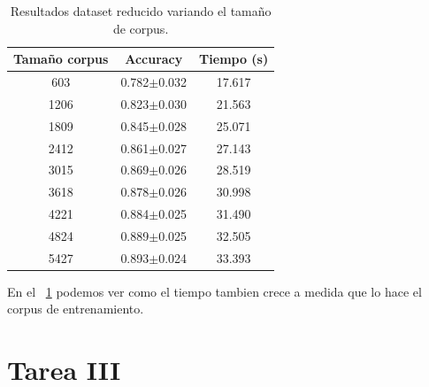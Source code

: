 \documentclass[11pt,a4paper]{report}
\begin{document}
    	\begin{table}[thb!]
    		\begin{center} 		
    			\begin{tabular}{ccc} 
    				\hline	
    				\textbf{Tamaño corpus}&\textbf{Accuracy}&\textbf{Tiempo (s)}\\
    				\hline
                    603&0.782$\pm$0.032&17.617\\
                    1206&0.823$\pm$0.030&21.563\\
                    1809&0.845$\pm$0.028&25.071\\
                    2412&0.861$\pm$0.027&27.143\\
                    3015&0.869$\pm$0.026&28.519\\
                    3618&0.878$\pm$0.026&30.998\\
                    4221&0.884$\pm$0.025&31.490\\
                    4824&0.889$\pm$0.025&32.505\\
                    5427&0.893$\pm$0.024&33.393\\
    				\hline
    			\end{tabular}
    			\caption{Resultados dataset reducido variando el tamaño de corpus.}	
    			\label{HMM_task2_table}
    		\end{center}
    	\end{table}
	
	En el \tablename~\ref{HMM_task2_table} podemos ver como el tiempo tambien crece a medida que lo hace el corpus de entrenamiento.
	

	
	\section*{Tarea III}
	
\end{document}
